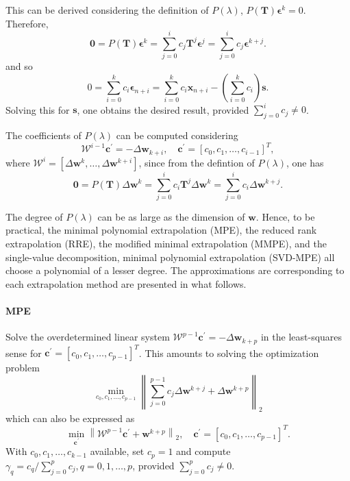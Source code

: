 This can be derived considering the definition of \(P(\lambda)\), \(P(\mathbf T) \boldsymbol \epsilon^k=0\).
Therefore,
\begin{equation}
\mathbf 0=P(\mathbf T) \boldsymbol \epsilon^{k}=\sum_{j=0}^{i} c_{j} \mathbf T^{j}  \boldsymbol\epsilon^{j}=\sum_{j=0}^{i} c_{j} \boldsymbol \epsilon^{k+j}.
\end{equation}
and so
\begin{equation}
0=\sum_{i=0}^{k} c_{i} \boldsymbol{\epsilon}_{n+i}=\sum_{i=0}^{k} c_{i} \boldsymbol{x}_{n+i}-\left(\sum_{i=0}^{k} c_{i}\right) \mathbf{s}.
\end{equation}
Solving this for \(\mathbf s\), one obtains the desired result, provided \(\sum_{j=0}^{i} c_{j} \neq 0\).

The coefficients of \(P(\lambda)\) can be computed considering
\begin{equation}
\mathscr W^{i-1} \mathbf c^{\prime}=-\Delta \mathbf w_{k+i}, \quad \mathbf c^{\prime}=\left[c_{0}, c_{1}, \ldots, c_{i-1}\right]^{T},
\end{equation}
where \(\mathscr W^i = [\Delta \mathbf w^k, \dots, \Delta \mathbf w^{k+i}]\), since from the defintion of \(P(\lambda)\), one has
\begin{equation}
  \mathbf 0 = P(\mathbf T) \Delta \mathbf w^k = \sum_{j=0}^i c_i \mathbf T^j \Delta \mathbf w^k = \sum_{j=0}^i c_i \Delta \mathbf w^{k+j}.
\end{equation}

The degree of \(P(\lambda)\) can be as large as the dimension of \(\mathbf w\).
Hence, to be practical, the minimal polynomial extrapolation (MPE), the reduced rank extrapolation (RRE), the modified minimal extrapolation (MMPE), and the single-value decomposition, minimal polynomial extrapolation (SVD-MPE) all choose a polynomial of a lesser degree.
The approximations are corresponding to each extrapolation method are presented in what follows.

\paragraph{MPE}

Solve the overdetermined linear system \(\mathscr W^{p-1} \mathbf c^{\prime}=-\Delta \mathbf w_{k+p}\) in the least-squares sense for \(\mathbf c^{\prime}=\left[c_{0}, c_{1}, \ldots, c_{p-1}\right]^{T}\).
This amounts to solving the optimization problem
\begin{equation}
\min _{c_{0}, c_{1}, \ldots, c_{p-1}}\left\|\sum_{j=0}^{p-1} c_{j} \Delta \mathbf w^ {k+j}+\Delta \mathbf w^{k+p}\right\|_2
\end{equation}
which can also be expressed as
\[
\min _{\mathbf c^{\prime}}\left\|\mathscr W^{p-1} \mathbf c^{\prime}+\mathbf w^{k+p}\right\|_2, \quad \mathbf c^{\prime}=\left[c_{0}, c_{1}, \ldots, c_{p-1}\right]^{T} .
\]
With \(c_{0}, c_{1}, \ldots, c_{k-1}\) available, set \(c_{p}=1\) and compute \(\gamma_{q}=c_{q} / \sum_{j=0}^{p} c_{j}, q=0,1, \ldots, p\), provided \(\sum_{j=0}^{p} c_{j} \neq 0\).

